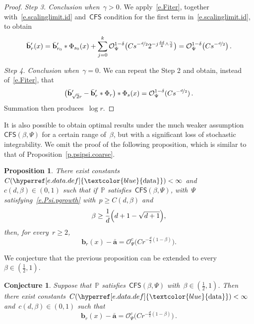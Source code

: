 \documentclass[11pt,twoside]{article} %
\numberwithin{equation}{section}
\newtheorem{conjecture}[theorem]{Conjecture}
\newtheorem{proposition}[theorem]{Proposition}
\theoremstyle{definition}
\newcommand{\dataref}{\hyperref[e.data.def]{\textcolor{blue}{\ensuremath{\mathrm{data}}}}}
\renewcommand{\b}{\ensuremath{\mathbf{b}}}
\renewcommand{\a}{\mathbf{a}}
\newcommand{\ahom}{\bar{\a}}
\newcommand{\bhom}{\bar{\mathbf{b}}}
\renewcommand{\P}{\mathbb{P}}
\renewcommand{\O}{\mathcal{O}}
\newcommand{\CFS}{\mathsf{CFS}}
\begin{document}
\begin{proof}
\smallskip

\emph{Step 3. Conclusion when~$\gamma>0$.} We apply~\eqref{e.Fiter}, together with~\eqref{e.scalinglimit.id} and~$\CFS$ condition for the first term in~\eqref{e.scalinglimit.id}, to obtain
\begin{equation*}  
\bhom_{r}' (x)  
=
\bhom_{r_{0}}'  \ast \Phi_{s_{0}}(x)   + \sum_{j=0}^k 
\O_\Psi^{1-\delta}\bigl(C s^{-\nicefrac d2} 2^{- j \frac{ \delta d}{4} \wedge \frac{\gamma}{2} } \bigr) 
=
\O_\Psi^{1-\delta}\bigl(C s^{-\nicefrac d2} \bigr) 
\,.
\end{equation*}

\smallskip

\emph{Step 4. Conclusion when~$\gamma=0$.} We can repeat the Step 2 and obtain, instead of~\eqref{e.Fiter}, that 
\begin{equation}  \label{e.Fiter.gammazero}
\bigl(  \bhom_{\sqrt{2} r}' - \bhom_{r}' \ast \Phi_{r} \bigr) \ast \Phi_{s}(x) 
= 
\O_\Psi^{1-\delta}(C s^{-\nicefrac d2}) 
\,.
\end{equation}
Summation then produces~$\log r$. 
\end{proof}

It is also possible to obtain optimal results under the much weaker assumption~$\CFS(\beta,\Psi)$ for a certain range of~$\beta$, but with a significant loss of stochastic integrability. We omit the proof of the following proposition, which is similar to that of Proposition~\ref{p.psipsi.coarse}.
 
\begin{proposition} 
\label{p.psi.coarse}
There exist constants~$C(\dataref) < \infty$ and~$c(d,\beta) \in (0,1)$ such that if~$\P$ satisfies~$\CFS(\beta,\Psi)$, with~$\Psi$ satisfying~\eqref{e.Psi.pgrowth} with~$p\geq C(d,\beta)$ and 
\begin{equation}  \label{e.Psibeta.beta.ass}
\beta \geq \frac{1}{d} \Bigl( d + 1 - \sqrt{d  + 1}  \Bigr), 
\end{equation}
then, for every~$r \geq 2$, 
\begin{equation}  \label{e.Psibeta.coarse}
\b_r(x) - \ahom 
= 
\O_{\Psi}^c \bigl( C  r^{-\frac d2(1-\beta)}   \bigr) . 
\end{equation}
\end{proposition}

We conjecture that the previous proposition can be extended to every~$\beta \in (\frac12 ,1 )$.  

\begin{conjecture}
Suppose that~$\P$ satisfies~$\CFS(\beta,\Psi)$ with~$\beta \in (\frac12 ,1 )$. Then there exist constants~$C(\dataref) < \infty$ and~$c(d,\beta) \in (0,1)$ such that 
\begin{equation*}
\b_r(x) - \ahom = \O_{\Psi}^c \bigl( C r^{-\frac d2(1-\beta)}  \bigr)\,.
\end{equation*}
\end{conjecture}
\end{document}
